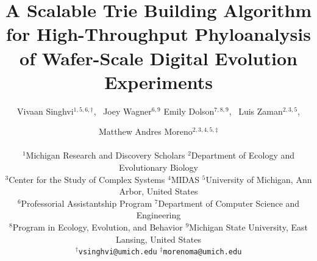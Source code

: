 \title{A Scalable Trie Building Algorithm for High-Throughput Phyloanalysis of Wafer-Scale Digital Evolution Experiments}

\author{
    Vivaan Singhvi$^{1,5,6,\dagger}$,\ %
    Joey Wagner$^{6,9}$
    Emily Dolson$^{7,8,9}$,\ %
    Luis Zaman$^{2,3,5}$, \and
    Matthew Andres Moreno$^{2,3,4,5,\ddagger}$ \\
    \mbox{}\\
    $^1$Michigan Research and Discovery Scholars
    $^2$Department of Ecology and Evolutionary Biology \\
    $^3$Center for the Study of Complex Systems
    $^4$MIDAS
    $^5$University of Michigan, Ann Arbor, United States \\
    $^6$Professorial Assistantship Program
    $^7$Department of Computer Science and Engineering \\
    $^8$Program in Ecology, Evolution, and Behavior
    $^9$Michigan State University, East Lansing, United States \\
    $^\dagger$\texttt{vsinghvi@umich.edu} $^\ddagger$\texttt{morenoma@umich.edu}
}

\maketitle
